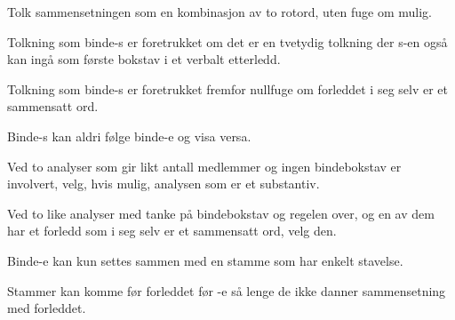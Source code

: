 \begin{enum}
	\item Tolk sammensetningen som en kombinasjon av to rotord, uten fuge om mulig.
	
		\newline
	
	\item Tolkning som binde-s er foretrukket om det er en tvetydig tolkning der s-en også kan ingå som første bokstav i et verbalt etterledd.
	
		\newline
	
	\item Tolkning som binde-s er foretrukket fremfor nullfuge om forleddet i seg selv er et sammensatt ord.
	
		\newline
	
	\item Binde-s kan aldri følge binde-e og visa versa.
		
		\newline
	
	\item Ved to analyser som gir likt antall medlemmer og ingen bindebokstav er involvert, velg, hvis mulig, analysen som er et substantiv.
		
		\newline
	
	\item Ved to like analyser med tanke på bindebokstav og regelen over, og en av dem har et forledd som i seg selv er et sammensatt ord, velg den.
		
		\newline
	
	\item Binde-e kan kun settes sammen med en stamme som har enkelt stavelse.
		
		\newline
		\newline
	
	\item Stammer kan komme før forleddet før -e så lenge de ikke danner sammensetning med forleddet.
		

\end{enum}
